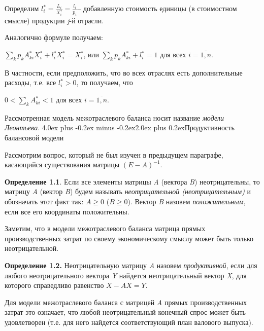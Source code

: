 \documentclass[12pt, 4paper]{book}
\makeatletter
\renewcommand{\section}{\@startsection{section}{1}{1pt}%
	{4.0ex plus -0.2ex minus -0.2ex}{2.0ex plus 0.2ex}{\centering\bf}}%
\makeatother
\begin{document}
{Определим $ l{}_i^* = \frac{L_i}{X{}_i^*} = \frac{l_i}{p_i} $– добавленную стоимость единицы (в стоимостном смысле) продукции  \textit{j}-й отрасли.
\par

Аналогично формуле  получаем:
\begin{center}
	$\sum\limits_k p_k A{}_{ki}^* X{}_i^* + l{}_i^* X{}_i^* =  X{}_i^*$, или $\sum\limits_k p_k A{}_{ki}^* + l{}_i^* = 1$ для всех $ i = \overline{1,n} $. 
\end{center}

В частности, если предположить, что во всех отраслях есть дополнительные расходы, т.е. все $ l{}_i^* > 0 $, то получаем, что
\begin{center}
	$ 0 < \sum\limits_k A{}_{ki}^* < 1 $ для всех $ i = \overline{1,n} $.
\end{center}
\par
	
Рассмотренная модель межотраслевого баланса носит название \textit{модели Леонтьева}.
\section{Продуктивность балансовой модели}
\par

Рассмотрим вопрос, который не был изучен в предыдущем параграфе, касающийся существования матрицы $ (E - A) ^ {-1} $.
\par

\textbf{Определение 1.1}. Если все элементы матрицы \textit{A} (вектора \textit{B}) неотрицательны, то матрицу \textit{A} (вектор \textit{B}) будем называть \textit{неотрицательной (неотрицательным)} и обозначать этот факт так: $ A \geq 0 $ ($ B \geq 0 $). Вектор \textit{B} назовем \textit{положительным}, если все его координаты положительны.
\par

Заметим, что в модели межотраслевого баланса матрица  прямых производственных затрат по своему экономическому смыслу может быть только неотрицательной.
\par

\textbf{Определение 1.2.} Неотрицательную матрицу \textit{A} назовем \textit{продуктивной}, если для любого неотрицательного вектора \textit{Y} найдется неотрицательный вектор \textit{X}, для которого справедливо равенство $ X - AX = Y $.
\par

Для модели межотраслевого баланса с матрицей \textit{A} прямых производственных затрат это означает, что любой неотрицательный конечный спрос может быть удовлетворен (т.е. для него найдется соответствующий план валового выпуска).
\par

}
\end{document}
